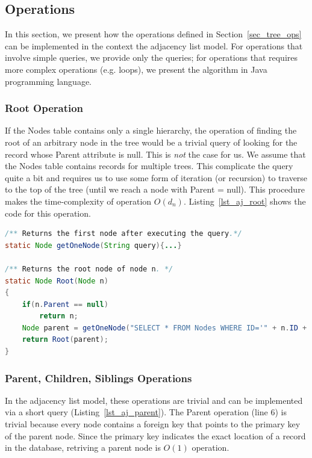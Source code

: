 \subsection{Operations}

In this section, we present how the operations defined in Section~\ref{sec_tree_ops} can be implemented in the context the adjacency list model. For operations that involve simple queries, we provide only the queries; for operations that requires more complex operations (e.g. loops), we present the algorithm in Java programming language.

\subsubsection{Root Operation}

If the Nodes table contains only a single hierarchy, the operation of finding the root of an arbitrary node in the tree would be a trivial query of looking for the record whose Parent attribute is null. This is \emph{not} the case for us. We assume that the Nodes table contains records for multiple trees. This complicate the query quite a bit and requires us to use some form of iteration (or recursion) to traverse to the top of the tree (until we reach a node with Parent = null). This procedure makes the time-complexity of operation $O(d_n)$. Listing~\ref{lst_aj_root} shows the code for this operation.

\begin{lstlisting}[language=java, style=java, caption=Root for Adjacency List, label=lst_aj_root]
/** Returns the first node after executing the query.*/
static Node getOneNode(String query){...}

/** Returns the root node of node n. */
static Node Root(Node n)
{
    if(n.Parent == null)
        return n;
    Node parent = getOneNode("SELECT * FROM Nodes WHERE ID='" + n.ID + "'");
    return Root(parent);
}

\end{lstlisting}


\subsubsection{Parent, Children, Siblings Operations}\label{sec_al_trivial_ops}

In the adjacency list model, these operations are trivial and can be implemented via a short query (Listing~\ref{lst_aj_parent}). The Parent operation (line 6) is trivial because every node contains a foreign key that points to the primary key of the parent node. Since the primary key indicates the exact location of a record in the database, retriving a parent node is $O(1)$ operation.

